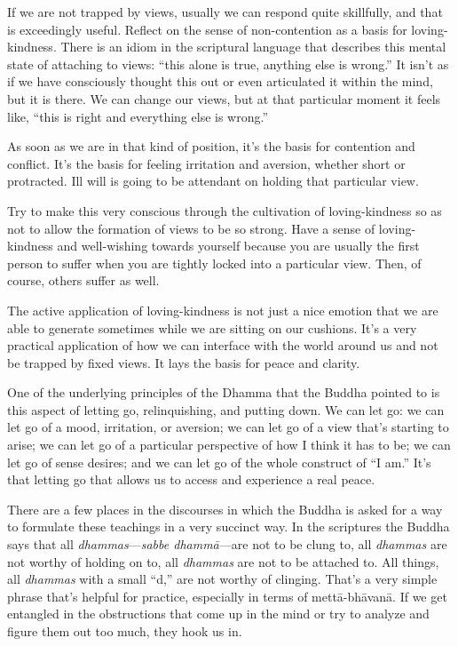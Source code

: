 If we are not trapped by views, usually we can respond quite skillfully,
and that is exceedingly useful. Reflect on the sense of non-contention
as a basis for loving-kindness. There is an idiom in the scriptural
language that describes this mental state of attaching to views: “this
alone is true, anything else is wrong.” It isn’t as if we have
consciously thought this out or even articulated it within the mind, but
it is there. We can change our views, but at that particular moment it
feels like, “this is right and everything else is wrong.”

As soon as we are in that kind of position, it’s the basis for
contention and conflict. It’s the basis for feeling irritation and
aversion, whether short or protracted. Ill will is going to be attendant
on holding that particular view.

Try to make this very conscious through the cultivation of
loving-kindness so as not to allow the formation of views to be so
strong. Have a sense of loving-kindness and well-wishing towards
yourself because you are usually the first person to suffer when you are
tightly locked into a particular view. Then, of course, others suffer as
well.

The active application of loving-kindness is not just a nice emotion
that we are able to generate sometimes while we are sitting on our
cushions. It’s a very practical application of how we can interface with
the world around us and not be trapped by fixed views. It lays the basis
for peace and clarity.

One of the underlying principles of the Dhamma that the Buddha pointed
to is this aspect of letting go, relinquishing, and putting down. We can
let go: we can let go of a mood, irritation, or aversion; we can let go
of a view that’s starting to arise; we can let go of a particular
perspective of how I think it has to be; we can let go of sense desires;
and we can let go of the whole construct of “I am.” It’s that letting go
that allows us to access and experience a real peace.

There are a few places in the discourses in which the Buddha is asked
for a way to formulate these teachings in a very succinct way. In the
scriptures the Buddha says that all \emph{dhammas}—\emph{sabbe
dhammā}—are not to be clung to, all \emph{dhammas} are not worthy of
holding on to, all \emph{dhammas} are not to be attached to. All things,
all \emph{dhammas} with a small “d,” are not worthy of clinging. That’s
a very simple phrase that’s helpful for practice, especially in terms of
mettā-bhāvanā. If we get entangled in the obstructions that come up in
the mind or try to analyze and figure them out too much, they hook us
in.

